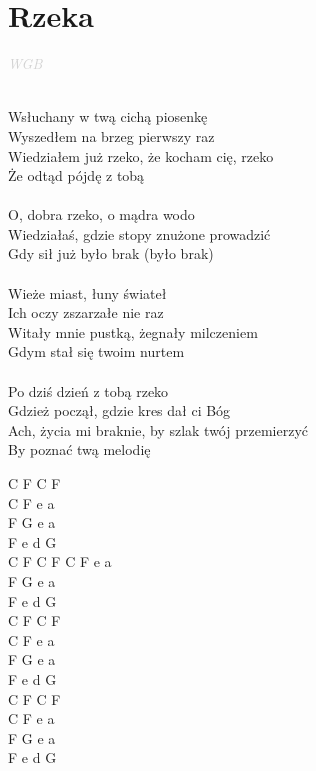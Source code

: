 \documentclass[a5paper, 10pt]{book}
\begin{document}
\newpage
\section{Rzeka}\textcolor{lightgray}{\textit{WGB}}\\~\\
\begin{minipage}[t]{0.75\textwidth}
  Wsłuchany w twą cichą piosenkę\\
  Wyszedłem na brzeg pierwszy raz\\
  Wiedziałem już rzeko, że kocham cię, rzeko\\
  Że odtąd pójdę z tobą\\
  \\
  \hspace*{5mm}O, dobra rzeko, o mądra wodo\\
  \hspace*{5mm}Wiedziałaś, gdzie stopy znużone prowadzić\\
  \hspace*{5mm}Gdy sił już było brak (było brak)\\
  \\
  Wieże miast, łuny świateł\\
  Ich oczy zszarzałe nie raz\\
  Witały mnie pustką, żegnały milczeniem\\
  Gdym stał się twoim nurtem\\
  \\
  Po dziś dzień z tobą rzeko\\
  Gdzież począł, gdzie kres dał ci Bóg\\
  Ach, życia mi braknie, by szlak twój przemierzyć\\
  By poznać twą melodię\\
\end{minipage}
\begin{minipage}[t]{0.25\textwidth}
  C F C F\\
  C F e a\\
  F G e a \\
  F e d G\\

  C F C F C F e a \\
  F G e a \\
  F e d G \\

  C F C F\\
  C F e a\\
  F G e a \\
  F e d G\\

  C F C F\\
  C F e a\\
  F G e a \\
  F e d G\\
\end{minipage}
\end{document}
